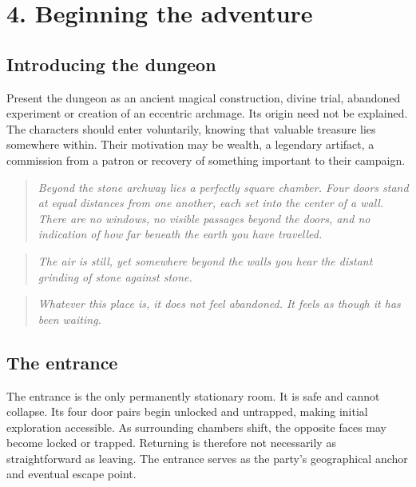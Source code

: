 \section{4. Beginning the adventure}

\subsection{Introducing the dungeon}

Present the dungeon as an ancient magical construction, divine trial, abandoned experiment or creation of an eccentric archmage. Its origin need not be explained. The characters should enter voluntarily, knowing that valuable treasure lies somewhere within. Their motivation may be wealth, a legendary artifact, a commission from a patron or recovery of something important to their campaign.

\begin{quote}\itshape Beyond the stone archway lies a perfectly square chamber. Four doors stand at equal distances from one another, each set into the center of a wall. There are no windows, no visible passages beyond the doors, and no indication of how far beneath the earth you have travelled.\end{quote}

\begin{quote}\itshape The air is still, yet somewhere beyond the walls you hear the distant grinding of stone against stone.\end{quote}

\begin{quote}\itshape Whatever this place is, it does not feel abandoned. It feels as though it has been waiting.\end{quote}

\subsection{The entrance}

The entrance is the only permanently stationary room. It is safe and cannot collapse. Its four door pairs begin unlocked and untrapped, making initial exploration accessible. As surrounding chambers shift, the opposite faces may become locked or trapped. Returning is therefore not necessarily as straightforward as leaving. The entrance serves as the party's geographical anchor and eventual escape point.

